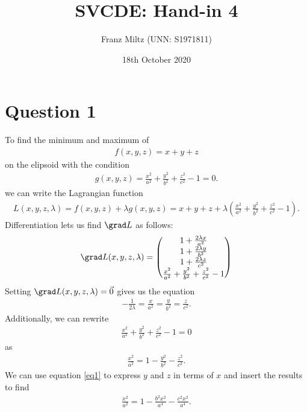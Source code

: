 \documentclass{article}
\begin{document}
\title{SVCDE: Hand-in 4}
\author{Franz Miltz (UNN: S1971811)}
\date{18th October 2020}
\maketitle


\section*{Question 1}


To find the minimum and maximum of
\begin{align*}
  f(x,y,z)=x + y + z
\end{align*}
on the elipsoid with the condition
\begin{align*}
  g(x,y,z)=\frac{x^2}{a^2} + \frac{y^2}{b^2} + \frac{z^2}{c^2}-1=0.
\end{align*}
we can write the Lagrangian function
\begin{align*}
  L(x,y,z,\lambda) = f(x,y,z)+\lambda g(x,y,z) =  x + y + z + \lambda\left(\frac{x^2}{a^2}+\frac{y^2}{b^2}+\frac{z^2}{c^2}-1\right).
\end{align*}
Differentiation lets us find $\grad L$ as follows:
\begin{align*}
  \grad L(x,y,z,\lambda)=\begin{pmatrix}
    1+\frac{2\lambda x}{a^2}\\
    1+\frac{2\lambda y}{b^2}\\
    1+\frac{2\lambda z}{c^2}\\
    \frac{x^2}{a^2}+\frac{y^2}{b^2}+\frac{z^2}{c^2}-1
  \end{pmatrix}
\end{align*}
Setting $\grad L(x,y,z,\lambda)=\vec 0$ gives us the equation
\begin{align}
  \label{eq1}
  -\frac{1}{2\lambda} = \frac{x}{a^2} = \frac{y}{b^2} = \frac{z}{c^2}.
\end{align}
Additionally, we can rewrite
\begin{align*}
  \frac{x^2}{a^2}+\frac{y^2}{b^2}+\frac{z^2}{c^2}-1=0
\end{align*}
as
\begin{align*}
  \frac{x^2}{a^2}=1-\frac{y^2}{b^2}-\frac{z^2}{c^2}.
\end{align*}
We can use equation \ref{eq1} to express $y$ and $z$ in terms of $x$ and
insert the results to find
\begin{align*}
  \frac{x^2}{a^2}=1-\frac{b^2x^2}{a^4}-\frac{c^2x^2}{a^4}.
\end{align*}
\end{document}
